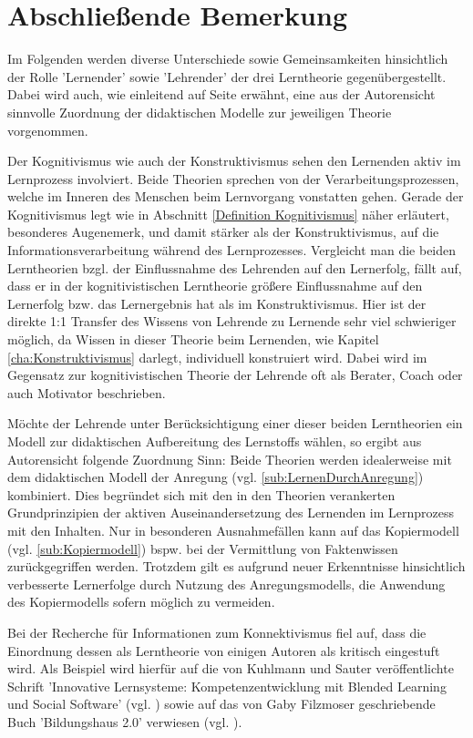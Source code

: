 \chapter{Abschließende Bemerkung}
\label{cha:Schluss}
Im Folgenden werden diverse Unterschiede sowie Gemeinsamkeiten hinsichtlich der Rolle 'Lernender' sowie 'Lehrender' der drei Lerntheorie gegenübergestellt. Dabei wird auch, wie einleitend auf Seite \pageref{cha:Einleitung} erwähnt, eine aus der Autorensicht sinnvolle Zuordnung der didaktischen Modelle zur jeweiligen Theorie vorgenommen. 

Der Kognitivismus wie auch der Konstruktivismus sehen den Lernenden aktiv im Lernprozess involviert. Beide Theorien sprechen von der Verarbeitungsprozessen, welche im Inneren des Menschen beim Lernvorgang vonstatten gehen. Gerade der Kognitivismus legt wie in Abschnitt \ref{Definition Kognitivismus} näher erläutert, besonderes Augenemerk, und damit stärker als der Konstruktivismus, auf die Informationsverarbeitung während des Lernprozesses. Vergleicht man die beiden Lerntheorien bzgl. der Einflussnahme des Lehrenden auf den Lernerfolg, fällt auf, dass er in der kognitivistischen Lerntheorie größere Einflussnahme auf den Lernerfolg bzw. das Lernergebnis hat als im Konstruktivismus. Hier ist der direkte 1:1 Transfer des Wissens von Lehrende zu Lernende sehr viel schwieriger möglich, da Wissen in dieser Theorie beim Lernenden, wie Kapitel \ref{cha:Konstruktivismus} darlegt, individuell konstruiert wird. Dabei wird im Gegensatz zur kognitivistischen Theorie der Lehrende oft als Berater, Coach oder auch Motivator beschrieben. \cite[S. 30ff.]{Bohm.2006}

Möchte der Lehrende unter Berücksichtigung einer dieser beiden Lerntheorien ein Modell zur didaktischen Aufbereitung des Lernstoffs wählen, so ergibt aus Autorensicht folgende Zuordnung Sinn: Beide Theorien werden idealerweise mit dem didaktischen Modell der Anregung (vgl. \ref{sub:LernenDurchAnregung}) kombiniert. Dies begründet sich mit den in den Theorien verankerten Grundprinzipien der aktiven Auseinandersetzung des Lernenden im Lernprozess mit den Inhalten. Nur in besonderen Ausnahmefällen kann auf das Kopiermodell (vgl. \ref{sub:Kopiermodell}) bspw. bei der Vermittlung von Faktenwissen zurückgegriffen werden. Trotzdem gilt es aufgrund neuer Erkenntnisse hinsichtlich verbesserte Lernerfolge durch Nutzung des Anregungsmodells, die Anwendung des Kopiermodells sofern möglich zu vermeiden.

Bei der Recherche für Informationen zum Konnektivismus fiel auf, dass die Einordnung dessen als Lerntheorie von einigen Autoren als kritisch eingestuft wird. Als Beispiel wird hierfür auf die von Kuhlmann und Sauter veröffentlichte Schrift 'Innovative Lernsysteme: Kompetenzentwicklung mit Blended Learning und Social Software' (vgl. \cite{Kuhlmann.2008}) sowie auf das von Gaby Filzmoser geschriebende Buch 'Bildungshaus 2.0' verwiesen (vgl. \cite{Filzmoser.2013}).

